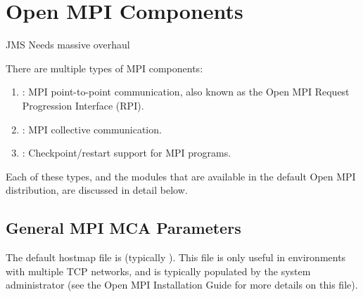 %
% 
% 
%

\chapter{Open MPI Components}
\label{sec:mca-ompi}

{\Huge JMS Needs massive overhaul}

There are multiple types of MPI components:

\begin{enumerate}
\item {}: MPI point-to-point communication, also known as the
  Open MPI Request Progression Interface (RPI).

\item {}: MPI collective communication.

\item {}: Checkpoint/restart support for MPI programs.
\end{enumerate}

Each of these types, and the modules that are available in the default
Open MPI distribution, are discussed in detail below.


\section{General MPI MCA Parameters}
\label{sec:mca-ompi:mpi-params}


The default hostmap file is  (typically
).  This file is only useful in
environments with multiple TCP networks, and is typically populated by
the system administrator (see the Open MPI Installation Guide for more
details on this file).

